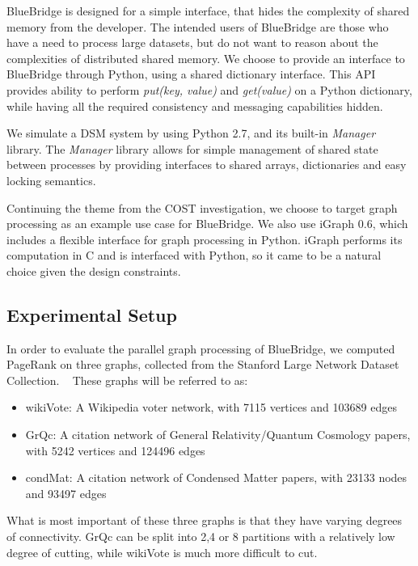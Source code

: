 BlueBridge is designed for a simple interface, that hides the complexity of
shared memory from the developer. The intended users of BlueBridge are those who
have a need to process large datasets, but do not want to reason about the
complexities of distributed shared memory. We choose to provide an interface
to BlueBridge through Python, using a shared dictionary interface. This API
provides ability to perform \textit{put(key, value)} and \textit{get(value)}
on a Python dictionary, while having all the required consistency and messaging
capabilities hidden.

We simulate a DSM system by using Python 2.7, and its built-in \textit{Manager}
library. The \textit{Manager} library allows for simple management of shared
state between processes by providing interfaces to shared arrays, dictionaries
and easy locking semantics. 

Continuing the theme from the COST investigation, we choose to target graph
processing as an example use case for BlueBridge. We also use iGraph 0.6, which
includes a flexible interface for graph processing in Python. iGraph performs
its computation in C and is interfaced with Python, so it came to be a natural 
choice given the design constraints.

\subsection{Experimental Setup}

In order to evaluate the parallel graph processing of BlueBridge, we computed 
PageRank on three graphs, collected from the Stanford Large Network Dataset 
Collection. ~\cite{snapnets} These graphs will be referred to as:

\begin{itemize}
	\item wikiVote: A Wikipedia voter network, with 7115 vertices and 103689 edges
	\item GrQc: A citation network of General Relativity/Quantum Cosmology papers,
	 with 5242 vertices and 124496 edges
	\item condMat: A citation network of Condensed Matter papers, with 23133 nodes
	 and 93497 edges
\end{itemize}

What is most important of these three graphs is that they have varying degrees of
connectivity. GrQc can be split into 2,4 or 8 partitions with a relatively low
degree of cutting, while wikiVote is much more difficult to cut.

